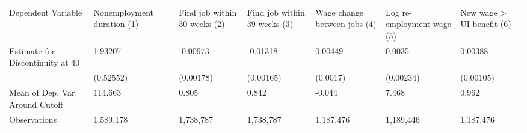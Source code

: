 \begin{tabular}{lllllll}
\toprule
Dependent Variable               &  Nonemployment duration (1) &  Find job within 30 weeks (2) &  Find job within 39 weeks (3) &  Wage change between jobs (4) &  Log re-employment wage (5) &  New wage > UI benefit (6) \\
Estimate for Discontinuity at 40 &                     1.93207 &                      -0.00973 &                      -0.01318 &                       0.00449 &                      0.0035 &                    0.00388 \\
                                 &                   (0.52552) &                     (0.00178) &                     (0.00165) &                      (0.0017) &                   (0.00234) &                  (0.00105) \\
Mean of Dep. Var. Around Cutoff  &                     114.663 &                         0.805 &                         0.842 &                        -0.044 &                       7.468 &                      0.962 \\
Observations                     &                   1,589,178 &                     1,738,787 &                     1,738,787 &                     1,187,476 &                   1,189,446 &                  1,187,476 \\
\bottomrule
\end{tabular}
